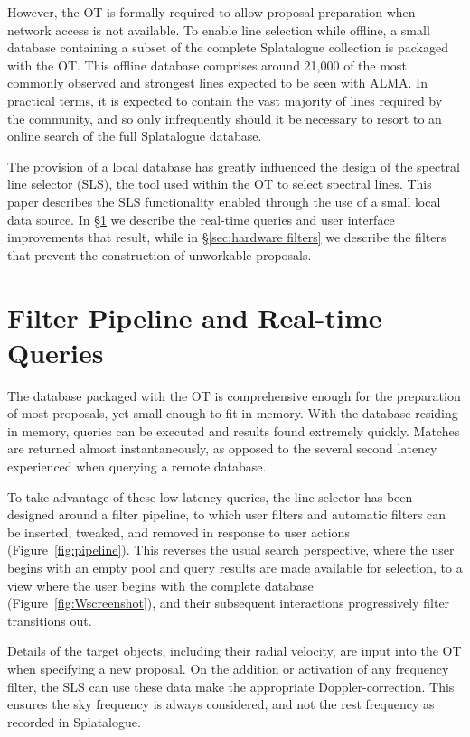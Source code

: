 However, the OT is formally required to allow proposal preparation when network access is not available. To enable line selection while offline, a small database containing a subset of the complete Splatalogue collection is packaged with the OT. This offline database comprises around 21,000 of the most commonly observed and strongest lines expected to be seen with ALMA. In practical terms, it is expected to contain the vast majority of lines required by the community, and so only infrequently should it be necessary to resort to an online search of the full Splatalogue database. 

The provision of a local database has greatly influenced the design of the spectral line selector (SLS), the tool used within the OT to select spectral lines. This paper describes the SLS functionality enabled through the use of a small local data source. In \S\ref{sec:real-time queries}  we describe the real-time queries and user interface improvements that result, while in \S\ref{sec:hardware filters} we describe the filters that prevent the construction of unworkable proposals.

\section{Filter Pipeline and Real-time Queries}
\label{sec:real-time queries}
The database packaged with the OT is comprehensive enough for the preparation of most proposals, yet small enough to fit in memory. With the database residing in memory, queries can be executed and results found extremely quickly. Matches are returned almost instantaneously, as opposed to the several second latency experienced when querying a remote database. 

To take advantage of these low-latency queries, the line selector has been designed around a filter pipeline, to which user filters and automatic filters can be inserted, tweaked, and removed in response to user actions (Figure~\ref{fig:pipeline}). This reverses the usual search perspective, where the user begins with an empty pool and query results are made available for selection, to a view where the user begins with the complete database (Figure~\ref{fig:Wscreenshot}), and their subsequent interactions progressively filter transitions out. 

Details of the target objects, including their radial velocity, are input into the OT when specifying a new proposal. On the addition or activation of any frequency filter, the SLS can use these data make the appropriate Doppler-correction. This ensures the sky frequency is always considered, and not the rest frequency as recorded in Splatalogue.

